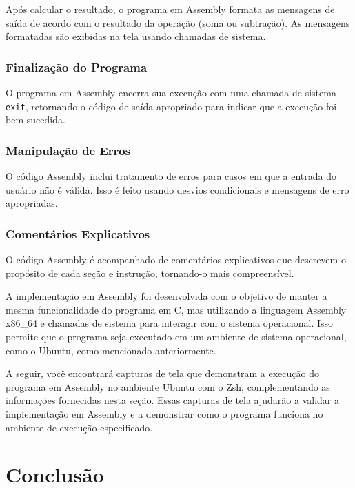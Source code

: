 \documentclass[
	12pt,				%
	openright,			%
	oneside,			%
	a4paper,			%
	chapter=TITLE,		%
	english,			%
	french,				%
	spanish,			%
	brazil				%
	]{abntex2}
\theoremstyle{definition}
\begin{document}
Após calcular o resultado, o programa em Assembly formata as mensagens de saída de acordo com o resultado da operação (soma ou subtração). As mensagens formatadas são exibidas na tela usando chamadas de sistema.

\subsection{Finalização do Programa}

O programa em Assembly encerra sua execução com uma chamada de sistema \texttt{exit}, retornando o código de saída apropriado para indicar que a execução foi bem-sucedida.

\subsection{Manipulação de Erros}

O código Assembly inclui tratamento de erros para casos em que a entrada do usuário não é válida. Isso é feito usando desvios condicionais e mensagens de erro apropriadas.

\subsection{Comentários Explicativos}

O código Assembly é acompanhado de comentários explicativos que descrevem o propósito de cada seção e instrução, tornando-o mais compreensível.

A implementação em Assembly foi desenvolvida com o objetivo de manter a mesma funcionalidade do programa em C, mas utilizando a linguagem Assembly x86\_64 e chamadas de sistema para interagir com o sistema operacional. Isso permite que o programa seja executado em um ambiente de sistema operacional, como o Ubuntu, como mencionado anteriormente.

A seguir, você encontrará capturas de tela que demonstram a execução do programa em Assembly no ambiente Ubuntu com o Zsh, complementando as informações fornecidas nesta seção. Essas capturas de tela ajudarão a validar a implementação em Assembly e a demonstrar como o programa funciona no ambiente de execução especificado.




\chapter{Conclusão}
\label{conclusao}
\end{document}
